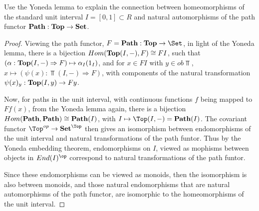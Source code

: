 \documentclass[main.tex]{subfiles}
\begin{document}
\begin{exercise}
	Use the Yoneda lemma to explain the connection between homeomorphisms of the
	standard unit interval $I = [0,1] \subset R$ and natural automorphisms of the
	path functor $\bold {Path} : \bold {Top} \rightarrow \bold {Set}$.
\end{exercise}

\begin{proof}
	Viewing the path functor, $F = \bold {Path}: \bold{Top} \rightarrow
	\Set$, in light of the Yoneda lemma, there is a bijection $Hom(
	\bold{Top} (I,-),F) \cong FI$, such that $(\alpha : \bold{Top} (I,-)
	\Rightarrow F) \mapsto \alpha_I (1_I)$, and for $x \in FI$ with $y \in ob
	\Top$, $x \mapsto (\psi (x) : \Top(I,-) \Rightarrow F)$, with
	components of the natural transformation $\psi(x)_y : \bold{Top} (I,y)
	\rightarrow Fy$.

	Now, for paths in the unit interval, with continuous functions $f$ being mapped
	to $Ff(x)$, from the Yoneda lemma again, there is a bijection $Hom(\bold{Path},
	\bold{Path}) \cong \bold{Path} (I)$, with $I \mapsto \Top(I,-) =
	\bold{Path} (I)$. The covariant functor $\Top^{op} \rightarrow
	\bold{Set}^{\Top}$ then gives an isomorphism between endomorphisms of the
	unit interval and natural transformations of the path funtor. Thus by the
	Yoneda embedding theorem, endomorphisms on $I$, viewed as mophisms between
	objects in $End(I)^{\op}$ correspond to natural transformations of the path
	funtor.

	Since these endomorphisms can be viewed as monoids, then the isomorphism is
	also between monoids, and those natural endomorphisms that are natural
	automorphisms of the path functor, are isomorphic to the homeomorphisms of
	the unit interval.
\end{proof}
\end{document}
